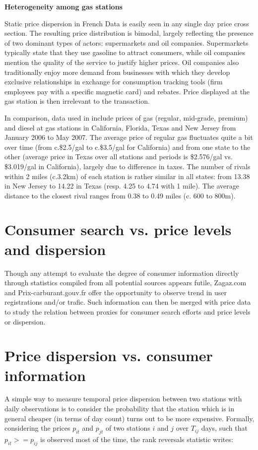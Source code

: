 \documentclass[11pt]{article}
\begin{document}
\textbf{Heterogeneity among gas stations}

Static price dispersion in French Data is easily seen in any single day price cross section. The resulting price distribution is bimodal, largely reflecting the presence of two dominant types of actors: supermarkets and oil companies. Supermarkets typically state that they use gasoline to attract consumers, while oil companies mention the quality of the service to justify higher prices. Oil companies also traditionally enjoy more demand from businesses with which they develop exclusive relationships in exchange for consumption tracking tools (firm employees pay with a specific magnetic card) and rebates. Price displayed at the gas station is then irrelevant to the transaction.

In comparison, data used in \cite{TAP11} include prices of gas (regular, mid-grade, premium) and diesel at gas stations in California, Florida, Texas and New Jersey from January 2006 to May 2007. The average price of regular gas fluctuates quite a bit over time (from c.\$2.5/gal to c.\$3.5/gal for California) and from one state to the other (average price in Texas over all stations and periods is \$2.576/gal vs. \$3.019/gal in California), largely due to difference in taxes. The number of rivals within 2 miles (c.3.2km) of each station is rather similar in all states: from 13.38 in New Jersey to 14.22 in Texas (resp. 4.25 to 4.74 with 1 mile). The average distance to the closest rival ranges from 0.38 to 0.49 miles (c. 600 to 800m).

\section{Consumer search vs. price levels and dispersion}

Though any attempt to evaluate the degree of consumer information directly through statistics compiled from all potential sources appears futile, Zagaz.com and Prix-carburant.gouv.fr offer the opportunity to observe trend in user registrations and/or trafic. Such information can then be merged with price data to study the relation between proxies for consumer search efforts and price levels or dispersion.

\section{Price dispersion vs. consumer information}

A simple way to measure temporal price dispersion between two stations with daily observations is to consider the probability that the station which is in general cheaper (in terms of day count) turns out to be more expensive. Formally, considering the prices $p_{it}$ and $p_{jt}$ of two stations $i$ and $j$ over $T_{ij}$ days, such that $p_{it} >= p_{ij}$ is observed most of the time, the rank reversals statistic writes:
\end{document}
